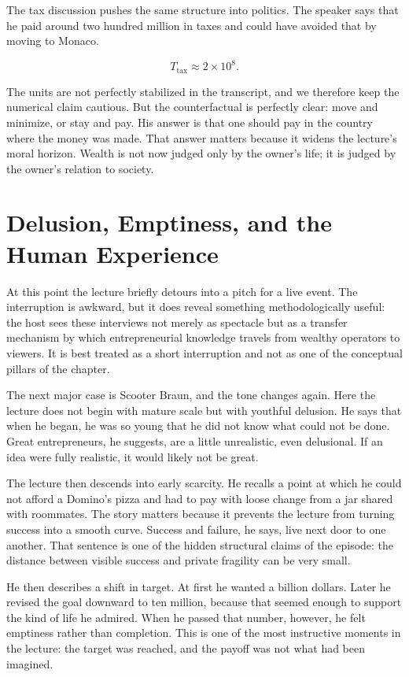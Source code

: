 The tax discussion pushes the same structure into politics. The speaker says that he paid around two hundred million in taxes and could have avoided that by moving to Monaco.

\begin{equation}
T_{\text{tax}} \approx 2 \times 10^{8}.
\end{equation}

The units are not perfectly stabilized in the transcript, and we therefore keep the numerical claim cautious. But the counterfactual is perfectly clear: move and minimize, or stay and pay. His answer is that one should pay in the country where the money was made. That answer matters because it widens the lecture's moral horizon. Wealth is not now judged only by the owner's life; it is judged by the owner's relation to society.

\section{Delusion, Emptiness, and the Human Experience}

At this point the lecture briefly detours into a pitch for a live event. The interruption is awkward, but it does reveal something methodologically useful: the host sees these interviews not merely as spectacle but as a transfer mechanism by which entrepreneurial knowledge travels from wealthy operators to viewers. It is best treated as a short interruption and not as one of the conceptual pillars of the chapter.

The next major case is Scooter Braun, and the tone changes again. Here the lecture does not begin with mature scale but with youthful delusion. He says that when he began, he was so young that he did not know what could not be done. Great entrepreneurs, he suggests, are a little unrealistic, even delusional. If an idea were fully realistic, it would likely not be great.

The lecture then descends into early scarcity. He recalls a point at which he could not afford a Domino's pizza and had to pay with loose change from a jar shared with roommates. The story matters because it prevents the lecture from turning success into a smooth curve. Success and failure, he says, live next door to one another. That sentence is one of the hidden structural claims of the episode: the distance between visible success and private fragility can be very small.

He then describes a shift in target. At first he wanted a billion dollars. Later he revised the goal downward to ten million, because that seemed enough to support the kind of life he admired. When he passed that number, however, he felt emptiness rather than completion. This is one of the most instructive moments in the lecture: the target was reached, and the payoff was not what had been imagined.

